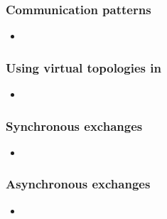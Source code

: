 \begin{frame}[fragile]
%
  \frametitle{Communication patterns}
%
  \begin{itemize}
%
  \item
% 
  \end{itemize}
%
\end{frame}

\begin{frame}[fragile]
%
  \frametitle{Using virtual topologies in \mpi}
%
  \begin{itemize}
%
  \item
% 
  \end{itemize}
%
\end{frame}

\begin{frame}[fragile]
%
  \frametitle{Synchronous exchanges}
%
  \begin{itemize}
%
  \item
% 
  \end{itemize}
%
\end{frame}

\begin{frame}[fragile]
%
  \frametitle{Asynchronous exchanges}
%
  \begin{itemize}
%
  \item
% 
  \end{itemize}
%
\end{frame}


